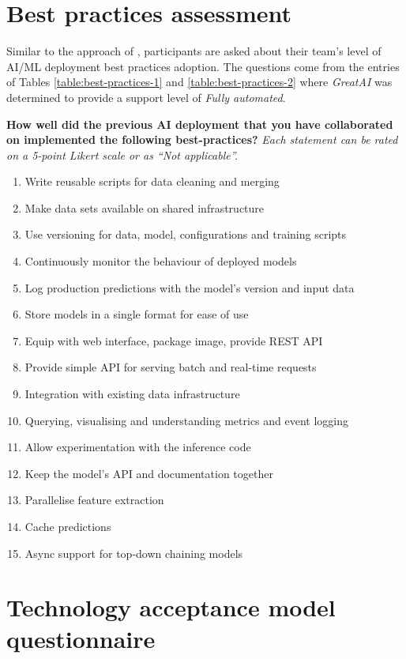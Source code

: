 \appendix

\chapter{Best practices assessment} \label{appendix:practices}

Similar to the approach of \cite{serban2020adoption}, participants are asked about their team's level of AI/ML deployment best practices adoption. The questions come from the entries of Tables \ref{table:best-practices-1} and \ref{table:best-practices-2} where \textit{GreatAI} was determined to provide a support level of \textit{Fully automated}.

\textbf{How well did the previous AI deployment that you have collaborated on implemented the following best-practices?} \textit{Each statement can be rated on a 5-point Likert scale or as ``Not applicable''.}

\begin{enumerate}
\item Write reusable scripts for data cleaning and merging
\item Make data sets available on shared infrastructure
\item Use versioning for data, model, configurations and training scripts
\item Continuously monitor the behaviour of deployed models
\item Log production predictions with the model's version and input data
\item Store models in a single format for ease of use
\item Equip with web interface, package image, provide REST API
\item Provide simple API for serving batch and real-time requests
\item Integration with existing data infrastructure
\item Querying, visualising and understanding metrics and event logging
\item Allow experimentation with the inference code
\item Keep the model's API and documentation together
\item Parallelise feature extraction
\item Cache predictions
\item Async support for top-down chaining models
\end{enumerate}

\chapter{Technology acceptance model questionnaire} \label{appendix:questions}

